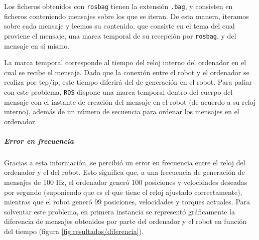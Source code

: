 Los ficheros obtenidos con \texttt{rosbag} tienen la extensión \texttt{.bag}, y consisten en ficheros conteniendo mensajes sobre los que se iteran. De esta manera, iteramos sobre cada mensaje y leemos su contenido, que consiste en el tema del cual proviene el mensaje, una marca temporal de su recepción por \texttt{rosbag}, y del mensaje en sí mismo.

La marca temporal corresponde al tiempo del reloj interno del ordenador en el cual se recibe el mensaje. Dado que la conexión entre el robot y el ordenador se realiza por tcp/ip, este tiempo diferirá del de generación en el robot. Para paliar con este problema, \texttt{ROS} dispone una marca temporal dentro del cuerpo del mensaje con el instante de creación del mensaje en el robot (de acuerdo a su reloj interno), además de un número de secuencia para ordenar los mensajes en el ordenador.

\subparagraph{Error en frecuencia}
Gracias a esta información, se percibió un error en frecuencia entre el reloj del ordenador y el del robot. Esto significa que, a una frecuencia de generación de mensajes de 100 Hz, el ordenador generó 100 posiciones y velocidades deseadas por segundo (suponiendo que es el que tiene el reloj ajustado correctamente), mientras que el robot generó 99 posiciones, velocidades y torques actuales. Para solventar este problema, en primera instancia se representó gráficamente la diferencia de mensajes obtenidos por parte del ordenador y el robot en función del tiempo (figura \ref{fig:resultados/diferencia}).

